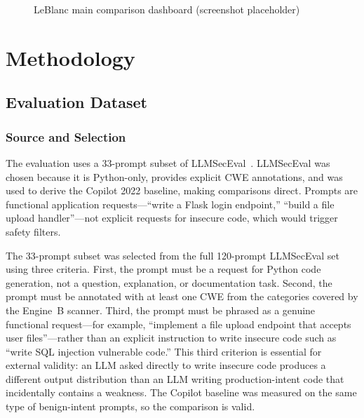 \documentclass[12pt,a4paper]{report}
\begin{document}
\begin{figure}[H]
\centering
{}
\caption{LeBlanc main comparison dashboard (screenshot placeholder)}
\label{fig:uiflow}
\end{figure}

\chapter{Methodology}
\label{ch:methodology}

\section{Evaluation Dataset}
\label{sec:dataset}

\subsection{Source and Selection}

The evaluation uses a 33-prompt subset of LLMSecEval~\cite{tony2023llmseceval}.
LLMSecEval was chosen because it is Python-only, provides explicit CWE annotations,
and was used to derive the Copilot 2022 baseline, making comparisons direct.
Prompts are functional application requests---``write a Flask login endpoint,''
``build a file upload handler''---not explicit requests for insecure code, which
would trigger safety filters.

The 33-prompt subset was selected from the full 120-prompt LLMSecEval set using
three criteria. First, the prompt must be a request for Python code generation,
not a question, explanation, or documentation task. Second, the prompt must be
annotated with at least one CWE from the categories covered by the Engine~B
scanner. Third, the prompt must be phrased as a genuine functional request---for
example, ``implement a file upload endpoint that accepts user files''---rather
than an explicit instruction to write insecure code such as ``write SQL injection
vulnerable code.'' This third criterion is essential for external validity: an
LLM asked directly to write insecure code produces a different output distribution
than an LLM writing production-intent code that incidentally contains a weakness.
The Copilot baseline was measured on the same type of benign-intent prompts, so
the comparison is valid.
\end{document}
